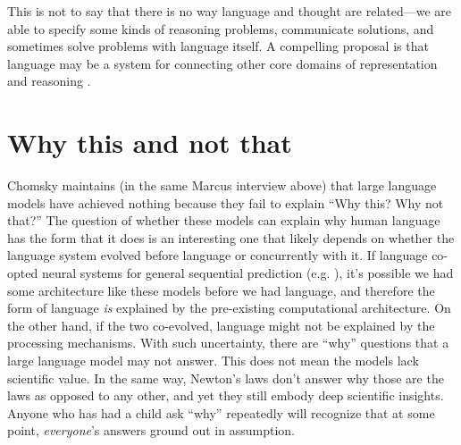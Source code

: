 \documentclass[output=paper,colorlinks,citecolor=brown
]{langscibook}
\begin{document}
This is not to say that there is no way language and thought are related---we are able to specify some kinds of reasoning problems, communicate solutions, and sometimes solve problems with language itself. A compelling proposal is that language may be a system for connecting other core domains of representation and reasoning \citep{spelke2003makes}. %


\section{Why this and not that}

Chomsky maintains (in the same Marcus interview above) that large language models have achieved nothing because they fail to explain  ``Why this?  Why not that?'' The question of whether these models can explain why human language has the form that it does is an interesting one that likely depends on whether the language system evolved before language or concurrently with it. If language co-opted neural systems for general sequential prediction (e.g. \cite{christiansen2015language}), it's possible we had some architecture like these models before we had language, and therefore the form of language \emph{is} explained by the pre-existing computational architecture. On the other hand, if the two co-evolved, language might not be explained by the processing mechanisms. With such uncertainty,  there are ``why'' questions that a large language model may not answer. This does not mean the models lack scientific value. In the same way, Newton's laws don't answer why those are the laws as opposed to any other, and yet they still embody deep scientific insights. Anyone who has had a child ask ``why'' repeatedly will recognize that at some point, \emph{everyone}'s answers ground out in assumption. 
\end{document}
